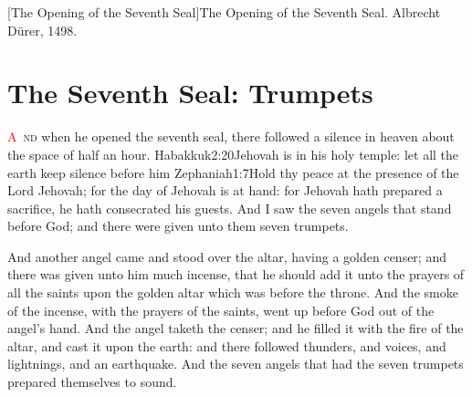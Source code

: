 [The Opening of the Seventh Seal]{The Opening of the Seventh Seal. Albrecht Dürer, 1498.}

\chapter{The Seventh Seal: Trumpets}
\lettrine[lines=3]{\textcolor{red}{A}}{\ nd} when he opened the seventh seal, there followed a silence in heaven about the space of half an hour.%
				{Habakkuk}{2:20}{Jehovah is in his holy temple: let all the earth keep silence before him}%
				{Zephaniah}{1:7}{Hold thy peace at the presence of the Lord Jehovah; for the day of Jehovah is at hand: for Jehovah hath prepared a sacrifice, he hath consecrated his guests.} %
And I saw the seven angels that stand before God; and there were given unto them seven trumpets.

And another angel came and stood over the altar, having a golden censer; and there was given unto him much incense, that he should add it unto the prayers of all the saints%
upon the golden altar which was before the throne.%
And the smoke of the incense, with the prayers of the saints, went up before God out of the angel’s hand. %
And the angel taketh the censer; and he filled it with the fire of the altar, and cast it upon the earth:%
and there followed thunders, and voices, and lightnings, and an earthquake.%
And the seven angels that had the seven trumpets prepared themselves to sound.\\

